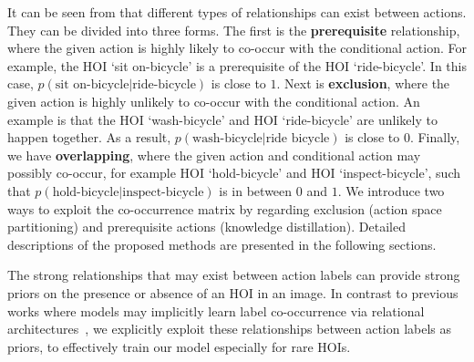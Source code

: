 It can be seen from  that different types of relationships can exist between actions. 
They can be divided into three forms.
The first is the \textbf{prerequisite} relationship, where the given action is highly likely to co-occur with the conditional action. 
For example, the HOI `sit on-bicycle' is a prerequisite of the HOI `ride-bicycle'. 
In this case, 
$p(\text{sit on-bicycle}|\text{ride-bicycle})$ is close to $1$.
Next is \textbf{exclusion}, where the given action is highly unlikely to co-occur with the conditional action. An example is that the HOI `wash-bicycle' and HOI `ride-bicycle' are unlikely to happen together. 
As a result, $p(\text{wash-bicycle}|\text{ride bicycle})$ is close to $0$.
Finally, we have \textbf{overlapping}, where the given action and conditional action may possibly co-occur, for example HOI `hold-bicycle' and HOI `inspect-bicycle', such that $p(\text{hold-bicycle}|\text{inspect-bicycle})$ is in between $0$ and $1$.
We introduce two 
ways to exploit the co-occurrence matrix by regarding exclusion (action space partitioning) and prerequisite actions (knowledge distillation). 
Detailed descriptions of the proposed methods are presented in the following sections.





The strong relationships that may exist between action labels can provide strong priors on the presence or absence of an HOI in an image. 
{In contrast to previous works where models may implicitly learn label co-occurrence via relational architectures~\cite{baradel2018object,zhang2019co}, we explicitly exploit these relationships between action labels as priors, to effectively train our model especially for rare HOIs.}













